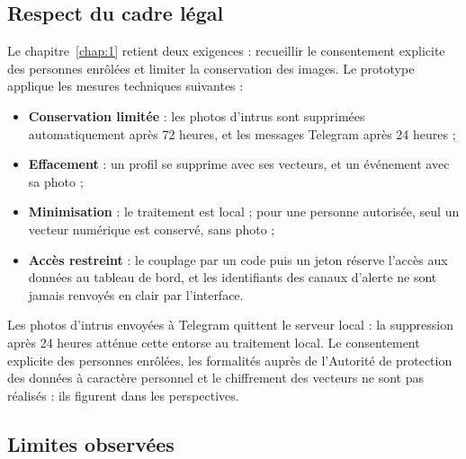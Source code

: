 \subsection{Respect du cadre légal}

\begin{maj}
Le chapitre~\ref{chap:1} retient deux exigences : recueillir le consentement explicite des personnes enrôlées et limiter la conservation des images. Le prototype applique les mesures techniques suivantes :
\begin{itemize}
  \item \textbf{Conservation limitée} : les photos d'intrus sont supprimées automatiquement après 72 heures, et les messages Telegram après 24 heures ;
  \item \textbf{Effacement} : un profil se supprime avec ses vecteurs, et un événement avec sa photo ;
  \item \textbf{Minimisation} : le traitement est local ; pour une personne autorisée, seul un vecteur numérique est conservé, sans photo ;
  \item \textbf{Accès restreint} : le couplage par un code puis un jeton réserve l'accès aux données au tableau de bord, et les identifiants des canaux d'alerte ne sont jamais renvoyés en clair par l'interface.
\end{itemize}
Les photos d'intrus envoyées à Telegram quittent le serveur local : la suppression après 24 heures atténue cette entorse au traitement local. Le consentement explicite des personnes enrôlées, les formalités auprès de l'Autorité de protection des données à caractère personnel et le chiffrement des vecteurs ne sont pas réalisés : ils figurent dans les perspectives.
\end{maj}

\subsection{Limites observées}

